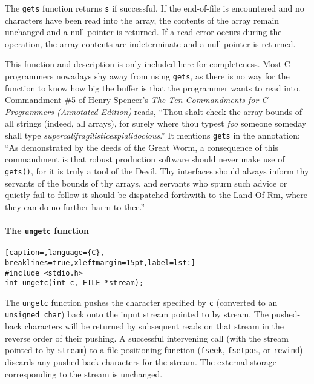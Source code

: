 The \texttt{gets} function returns \texttt{s} if successful. If the end-of-file
is encountered and no characters have been read into the array, the contents of
the array remain unchanged and a null pointer is returned. If a read error
occurs during the operation, the array contents are indeterminate and a null
pointer is returned.

This function and description is only included here for completeness. Most C
programmers nowadays shy away from using \texttt{gets}, as there is no way for
the function to know how big the buffer is that the programmer wants to read
into. Commandment \#5 of
\href{http://en.wikipedia.org/wiki/Henry_Spencer}{Henry Spencer}'s \emph{The
Ten Commandments for C Programmers (Annotated Edition)} reads, ``Thou shalt
check the array bounds of all strings (indeed, all arrays), for surely where
thou typest \emph{foo} someone someday shall type
\emph{supercalifragilisticexpialidocious}.'' It mentions \texttt{gets} in the
annotation: ``As demonstrated by the deeds of the Great Worm, a consequence of
this commandment is that robust production software should never make use of
\texttt{gets()}, for it is truly a tool of the Devil. Thy interfaces should
always inform thy servants of the bounds of thy arrays, and servants who spurn
such advice or quietly fail to follow it should be dispatched forthwith to the
Land Of Rm, where they can do no further harm to thee.''

\paragraph{The \texttt{ungetc} function}
\lstset{basicstyle=\scriptsize, numbers=left, captionpos=b, tabsize=4}
\begin{lstlisting}[caption=,language={C},
breaklines=true,xleftmargin=15pt,label=lst:]
#include <stdio.h>
int ungetc(int c, FILE *stream);
\end{lstlisting}

The \texttt{ungetc} function pushes the character specified by \texttt{c}
(converted to an \texttt{unsigned char}) back onto the input stream pointed to
by stream. The pushed-back characters will be returned by subsequent reads on
that stream in the reverse order of their pushing. A successful intervening
call (with the stream pointed to by \texttt{stream}) to a file-positioning
function (\texttt{fseek}, \texttt{fsetpos}, or \texttt{rewind}) discards any
pushed-back characters for the stream. The external storage corresponding to
the stream is unchanged.

